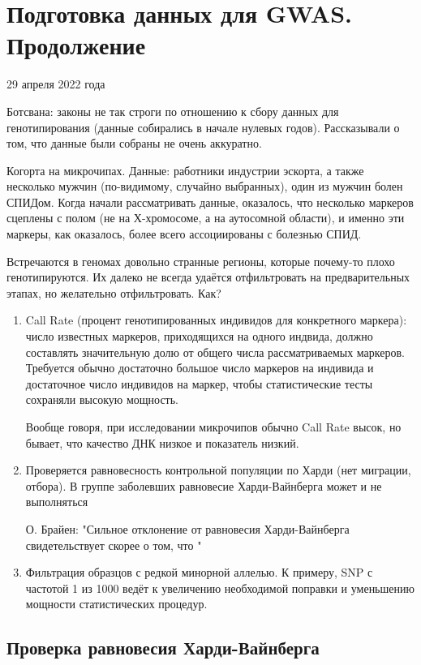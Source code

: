 \documentclass[main.tex]{subfiles}
\begin{document}
\section{Подготовка данных для GWAS. Продолжение}

29 апреля 2022 года

Ботсвана: законы не так строги по отношению к сбору данных для генотипирования (данные собирались в начале нулевых годов).
Рассказывали о том, что данные были собраны не очень аккуратно.

Когорта на микрочипах.
Данные: работники индустрии эскорта, а также несколько мужчин (по-видимому, случайно выбранных), один из мужчин болен СПИДом.
Когда начали рассматривать данные, оказалось, что несколько маркеров сцеплены с полом (не на Х-хромосоме, а на аутосомной области), и именно эти маркеры, как оказалось, более всего ассоциированы с болезнью СПИД.

Встречаются в геномах довольно странные регионы, которые почему-то плохо генотипируются.
Их далеко не всегда удаётся отфильтровать на предварительных этапах, но желательно отфильтровать.
Как?

\begin{enumerate}[noitemsep]
	\item Call Rate (процент генотипированных индивидов для конкретного маркера): число известных маркеров, приходящихся на одного индвида, должно составлять значительную долю от общего числа рассматриваемых маркеров.
	Требуется обычно достаточно большое число маркеров на индивида и достаточное число индивидов на маркер, чтобы статистические тесты сохраняли высокую мощность.
	
	Вообще говоря, при исследовании микрочипов обычно Call Rate высок, но бывает, что качество ДНК низкое и показатель низкий.
	
	\item Проверяется равновесность контрольной популяции по Харди (нет миграции, отбора).
	В группе заболевших равновесие Харди-Вайнберга может и не выполняться 
	
	О. Брайен: "Сильное отклонение от равновесия Харди-Вайнберга свидетельствует скорее о том, что "
	
	\item Фильтрация образцов с редкой минорной аллелью.
	К примеру, SNP с частотой 1 из 1000 ведёт к увеличению необходимой поправки и уменьшению мощности статистических процедур.
\end{enumerate}

\subsection{Проверка равновесия Харди-Вайнберга}
\end{document}
